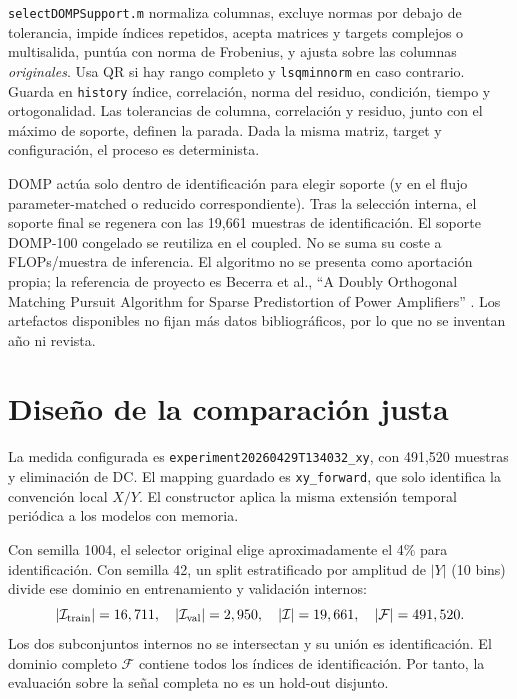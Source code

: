 \documentclass[10pt,a4paper]{article}
\begin{document}
\texttt{selectDOMPSupport.m} normaliza columnas, excluye normas por debajo de
tolerancia, impide índices repetidos, acepta matrices y targets complejos o
multisalida, puntúa con norma de Frobenius, y ajusta sobre las columnas
\emph{originales}. Usa QR si hay rango completo y \texttt{lsqminnorm} en caso
contrario. Guarda en \texttt{history} índice, correlación, norma del residuo,
condición, tiempo y ortogonalidad. Las tolerancias de columna, correlación y
residuo, junto con el máximo de soporte, definen la parada. Dada la misma matriz,
target y configuración, el proceso es determinista.

DOMP actúa solo dentro de identificación para elegir soporte (y en el flujo
parameter-matched o reducido correspondiente). Tras la selección interna, el
soporte final se regenera con las 19,661 muestras de identificación. El soporte
DOMP-100 congelado se reutiliza en el coupled. No se suma su coste a
FLOPs/muestra de inferencia. El algoritmo no se presenta como
aportación propia; la referencia de proyecto es Becerra et al., ``A Doubly
Orthogonal Matching Pursuit Algorithm for Sparse Predistortion of Power
Amplifiers'' \cite{becerra_domp}. Los artefactos disponibles no fijan más datos
bibliográficos, por lo que no se inventan año ni revista.

\section{Diseño de la comparación justa}

La medida configurada es \texttt{experiment20260429T134032\_xy}, con 491,520
muestras y eliminación de DC. El mapping guardado es \texttt{xy\_forward}, que
solo identifica la convención local $X/Y$. El constructor aplica la misma
extensión temporal periódica a los modelos con memoria.

Con semilla 1004, el selector original elige aproximadamente el 4\% para
identificación. Con semilla 42, un split estratificado por amplitud de $|Y|$
(10 bins) divide ese dominio en entrenamiento y validación internos:
\begin{equation*}
|\mathcal I_{\rm train}|=16,711,\quad |\mathcal I_{\rm val}|=2,950,\quad
|\mathcal I|=19,661,\quad |\mathcal F|=491,520.
\end{equation*}
Los dos subconjuntos internos no se intersectan y su unión es identificación.
El dominio completo $\mathcal F$ contiene todos los índices de identificación.
Por tanto, la evaluación sobre la señal completa no es un hold-out disjunto.
\end{document}
